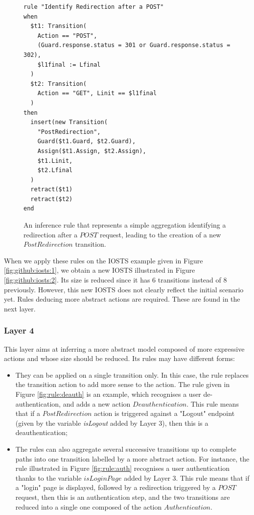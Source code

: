 \begin{figure}[h]
\begin{framed}
\begin{BVerbatim}
rule "Identify Redirection after a POST"
when
  $t1: Transition(
    Action == "POST",
    (Guard.response.status = 301 or Guard.response.status = 302),
    $l1final := Lfinal
  )
  $t2: Transition(
    Action == "GET", Linit == $l1final
  )
then
  insert(new Transition(
    "PostRedirection",
    Guard($t1.Guard, $t2.Guard),
    Assign($t1.Assign, $t2.Assign),
    $t1.Linit,
    $t2.Lfinal
  )
  retract($t1)
  retract($t2)
end
\end{BVerbatim}
\end{framed}

\caption{An inference rule that represents a simple aggregation
identifying a redirection after a $POST$ request, leading to the
creation of a new $PostRedirection$ transition.}
\label{fig:rule:redirect}
\end{figure}

\begin{example}
When we apply these rules on the IOSTS example given in Figure
\ref{fig:github:iosts:1}, we obtain a new IOSTS illustrated in
Figure \ref{fig:github:iosts:2}. Its size is reduced since it has
6 transitions instead of 8 previously.  However, this new IOSTS
does not clearly reflect the initial scenario yet. Rules deducing
more abstract actions are required. These are found in the next
layer.
\end{example}

\subsubsection{Layer 4}

This layer aims at inferring a more abstract model composed of
more expressive actions and whose size should be reduced. Its
rules may have different forms:

\begin{itemize}
\item They can be applied on a single transition only. In this
case, the rule replaces the transition action to add more sense
to the action. The rule given in Figure \ref{fig:rule:deauth} is
an example, which recognises a user de-authentication, and adds a
new action $Deauthentication$. This rule means that if a
$PostRedirection$ action is triggered against a "Logout" endpoint
(given by the variable \textit{isLogout} added by Layer 3), then
this is a deauthentication;

\item The rules can also aggregate several successive transitions
up to complete paths into one transition labelled by a more
abstract action. For instance, the rule illustrated in Figure
\ref{fig:rule:auth} recognises a user authentication thanks to
the variable $isLoginPage$ added by Layer 3. This rule means that
if a "login" page is displayed, followed by a redirection
triggered by a $POST$ request, then this is an authentication
step, and the two transitions are reduced into a single one
composed of the action $Authentication$.
\end{itemize}

